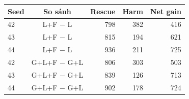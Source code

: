\scriptsize
\begin{tabular}{lcrrr}
\toprule
Seed & So sánh & Rescue & Harm & Net gain \\
\midrule
42 & L+F $-$ L & 798 & 382 & 416 \\
43 & L+F $-$ L & 815 & 194 & 621 \\
44 & L+F $-$ L & 936 & 211 & 725 \\
42 & G+L+F $-$ G+L & 806 & 303 & 503 \\
43 & G+L+F $-$ G+L & 839 & 126 & 713 \\
44 & G+L+F $-$ G+L & 902 & 178 & 724 \\
\bottomrule
\end{tabular}
